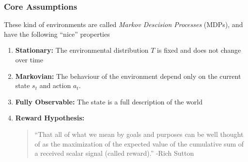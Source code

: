 \documentclass[10pt,a4paper]{beamer}
\begin{document}
\begin{frame}
\frametitle{Core Assumptions}

These kind of environments are called \textit{Markov Descision Processes} (MDPs),
and have the following ``nice'' properties
\begin{enumerate}
	\pause
		\item \textbf{Stationary:} The environmental distribution $T$
		is fixed and does not change over time
		\pause
		\item \textbf{Markovian:} The behaviour of the environment
		depend only on the current state $s_t$
		and action $a_t$. 
	\pause
		\item \textbf{Fully Observable:} The state is a full description
		of the world
	\pause
		\item \textbf{Reward Hypothesis:} 
		\begin{quote}
			``That all of what we mean by goals and purposes can be well thought of as
			the maximization of the expected value of the cumulative sum of a received
			scalar signal (called reward).'' -Rich Sutton
		\end{quote}
\end{enumerate}

\end{frame}
\end{document}
